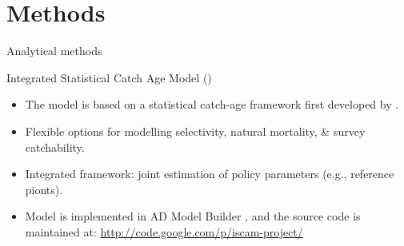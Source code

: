 \section{Methods} %
\label{sec:analyticalmethods}
%
\begin{frame} {Analytical methods} 
	
	\begin{block}
		{Integrated Statistical Catch Age Model (\iscam)}
		\begin{itemize}
			\item The model is based on a statistical catch-age framework first developed by \cite{fournier1982general}.
			
			\item Flexible options for modelling selectivity, natural mortality, \& survey catchability.
			
			\item Integrated framework: joint estimation of policy parameters (e.g., reference pionts).
			\item Model is implemented in AD Model Builder \cite{ADMB2009}, and the source code is maintained at:  \url{http://code.google.com/p/iscam-project/}
		\end{itemize}
	\end{block}
\end{frame}
%
